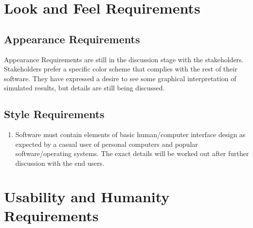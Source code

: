 \documentclass[paper=letter, fontsize=10pt]{scrartcl}
\numberwithin{equation}{section}		%
\numberwithin{figure}{section}			%
\numberwithin{table}{section}				%
\begin{document}
\section{Look and Feel Requirements}
\subsection{Appearance Requirements}
Appearance Requirements are still in the discussion stage with the stakeholders. Stakeholders prefer a specific color scheme that complies with the rest of their software. They have expressed a desire to see some graphical interpretation of simulated results, but details are still being discussed.
\subsection{Style Requirements}
\begin{enumerate}
	\item Software must contain elements of basic human/computer interface design as expected by a casual user of personal computers and popular software/operating systems. The exact details will be worked out after further discussion with the end users.
\end{enumerate}

\section{Usability and Humanity Requirements}
\end{document}

